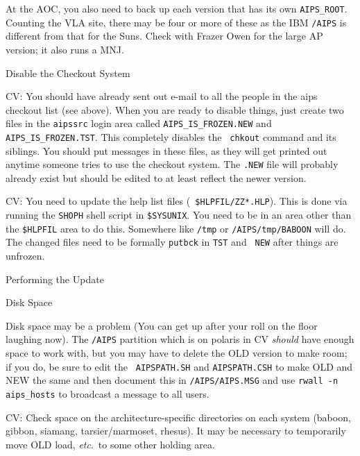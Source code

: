 \noindent At the AOC, you also need to back up each version that has its
own {\tt AIPS\_ROOT}.  Counting the VLA site, there may be four or more
of these as the IBM {\tt /AIPS} is different from that for the Suns.
Check with Frazer Owen for the large AP version; it also runs a MNJ.

\newsubsection Disable the Checkout System

\item{CV:}  You should have already sent out e-mail to all the people in
            the aips checkout list (see above).  When you are ready to
	    disable things, just create two files in the {\tt aipssrc}
	    login area called {\tt AIPS\_IS\_FROZEN.NEW} and {\tt
	    AIPS\_IS\_FROZEN.TST}.  This completely disables the {\tt
	    chkout} command and its siblings.  You should put messages
	    in these files, as they will get printed out anytime someone
	    tries to use the checkout system.  The {\tt .NEW} file will
	    probably already exist but should be edited to at least
	    reflect the newer version.\medskip

\item{CV:} You need to update the help list files ({\tt
	   \$HLPFIL/ZZ*.HLP}).  This is done via running the {\tt SHOPH}
	   shell script in {\tt\$SYSUNIX}.  You need to be in an area
	   other than the {\tt\$HLPFIL} area to do this.  Somewhere like
	   {\tt /tmp} or {\tt /AIPS/tmp/BABOON} will do.  The changed
	   files need to be formally {\tt putbck} in {\tt TST} and {\tt
	   NEW} after things are unfrozen. %

\medskip

\newsection Performing the Update

\newsubsection Disk Space

Disk space may be a problem (You can get up after your roll on the floor
laughing now).  The {\tt /AIPS} partition which is on polaris in CV {\it
should\/} have enough space to work with, but you may have to delete the
OLD version to make room; if you do, be sure to edit the {\tt
AIPSPATH.SH} and {\tt AIPSPATH.CSH} to make OLD and NEW the same and
then document this in {\tt /AIPS/AIPS.MSG} and use {\tt rwall -n
aips\_hosts} to broadcast a message to all users.

\item{CV:} Check space on the architecture-specific directories on each
	   system (baboon, gibbon, siamang, tarsier/marmoset, rhesus).
	   It may be necessary to temporarily move OLD load, {\it
	   etc\/}.~to some other holding area.

